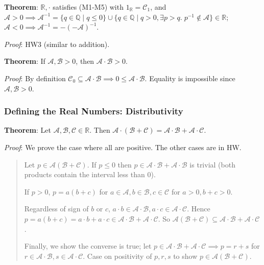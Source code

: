 \documentclass[11pt]{article}
\begin{document}
\textbf{Theorem}: $\mathbb{R}, \cdot$ satisfies (M1-M5) with $1_\mathbb{R} = \mathcal{C}_1$, and\\
$\mathcal{A} > 0 \implies \mathcal{A}^{-1} = \{q \in \mathbb{Q} \;|\; q \leq 0\} \cup \{q \in \mathbb{Q} \;|\; q > 0, \exists p > q.\; p^{-1} \notin \mathcal{A}\} \in \mathbb{R}$;\\
$\mathcal{A} < 0 \implies \mathcal{A}^{-1} = -(-\mathcal{A})^{-1}$.

\emph{Proof}: HW3 (similar to addition).

\textbf{Theorem}: If $\mathcal{A}, \mathcal{B} > 0$, then $\mathcal{A} \cdot \mathcal{B} > 0$.

\emph{Proof}: By definition $\mathcal{C}_0 \subseteq \mathcal{A} \cdot \mathcal{B} \implies 0 \leq \mathcal{A} \cdot \mathcal{B}$. Equality is impossible since $\mathcal{A}, \mathcal{B} > 0$.

\subsubsection{Defining the Real Numbers: Distributivity}

\textbf{Theorem}: Let $\mathcal{A}, \mathcal{B}, \mathcal{C} \in \mathbb{R}$. Then $\mathcal{A} \cdot (\mathcal{B} + \mathcal{C}) = \mathcal{A} \cdot \mathcal{B} + \mathcal{A} \cdot \mathcal{C}$.

\emph{Proof}: We prove the case where all are positive. The other cases are in HW.
\begin{quote}\vspace{-0.3cm}
Let $p \in \mathcal{A}(\mathcal{B} + \mathcal{C})$. If $p \leq 0$ then $p \in \mathcal{A} \cdot \mathcal{B} + \mathcal{A} \cdot \mathcal{B}$ is trivial (both products contain the interval less than 0).

If $p > 0$, $p = a(b+c)$ for $a \in \mathcal{A}, b \in \mathcal{B}, c \in \mathcal{C}$ for $a > 0, b + c > 0$.

Regardless of sign of $b$ or $c$, $a \cdot b \in \mathcal{A} \cdot \mathcal{B}, a \cdot c \in \mathcal{A} \cdot \mathcal{C}$. Hence $p = a(b+c) = a \cdot b + a \cdot c \in \mathcal{A} \cdot \mathcal{B} + \mathcal{A} \cdot \mathcal{C}$. So $\mathcal{A}(\mathcal{B} + \mathcal{C}) \subseteq \mathcal{A} \cdot \mathcal{B} + \mathcal{A} \cdot \mathcal{C}$.

Finally, we show the converse is true; let $p \in \mathcal{A} \cdot \mathcal{B} + \mathcal{A} \cdot \mathcal{C} \implies p = r+s$ for $r \in \mathcal{A} \cdot \mathcal{B}, s \in \mathcal{A} \cdot \mathcal{C}$. Case on positivity of $p,r,s$ to show $p \in \mathcal{A}(\mathcal{B} + \mathcal{C})$.
\end{quote}
\end{document}
